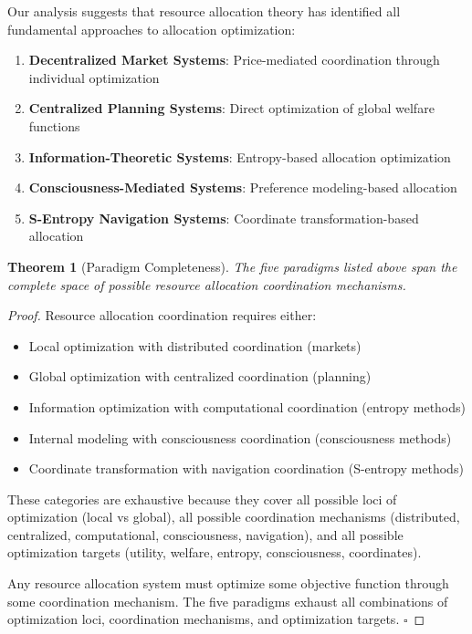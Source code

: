 \documentclass[12pt,a4paper]{article}
\newtheorem{theorem}{Theorem}
\begin{document}
Our analysis suggests that resource allocation theory has identified all fundamental approaches to allocation optimization:

\begin{enumerate}
\item \textbf{Decentralized Market Systems}: Price-mediated coordination through individual optimization
\item \textbf{Centralized Planning Systems}: Direct optimization of global welfare functions
\item \textbf{Information-Theoretic Systems}: Entropy-based allocation optimization
\item \textbf{Consciousness-Mediated Systems}: Preference modeling-based allocation
\item \textbf{S-Entropy Navigation Systems}: Coordinate transformation-based allocation
\end{enumerate}

\begin{theorem}[Paradigm Completeness]
The five paradigms listed above span the complete space of possible resource allocation coordination mechanisms.
\end{theorem}

\begin{proof}
Resource allocation coordination requires either:
\begin{itemize}
\item Local optimization with distributed coordination (markets)
\item Global optimization with centralized coordination (planning)
\item Information optimization with computational coordination (entropy methods)
\item Internal modeling with consciousness coordination (consciousness methods)
\item Coordinate transformation with navigation coordination (S-entropy methods)
\end{itemize}

These categories are exhaustive because they cover all possible loci of optimization (local vs global), all possible coordination mechanisms (distributed, centralized, computational, consciousness, navigation), and all possible optimization targets (utility, welfare, entropy, consciousness, coordinates).

Any resource allocation system must optimize some objective function through some coordination mechanism. The five paradigms exhaust all combinations of optimization loci, coordination mechanisms, and optimization targets. $\square$
\end{proof}
\end{document}
